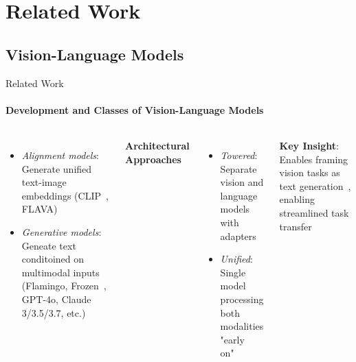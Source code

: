 \documentclass[aspectratio=169]{beamer}
\begin{document}
\section{Related Work}
\subsection{Vision-Language Models}
\begin{frame}{Related Work}
\framesubtitle{Development and Classes of Vision-Language Models}
  \begin{columns}[T]
    \begin{itemize}
      \item \emph{Alignment models}: Generate unified text-image embeddings (CLIP~, FLAVA)
      \item \emph{Generative models}: Geneate text conditoined on multimodal inputs (Flamingo, Frozen~, GPT-4o, Claude 3/3.5/3.7, etc.)
    \end{itemize}
      \textbf{Architectural Approaches}
      \begin{itemize}
        \item \emph{Towered}: Separate vision and language models with adapters
        \item \emph{Unified}: Single model processing both modalities "early on"~
      \end{itemize}
      \vspace{0.3em}
      \textbf{Key Insight}: Enables framing vision tasks as text generation~, enabling streamlined task transfer
  \end{columns}
\end{frame}
\end{document}

